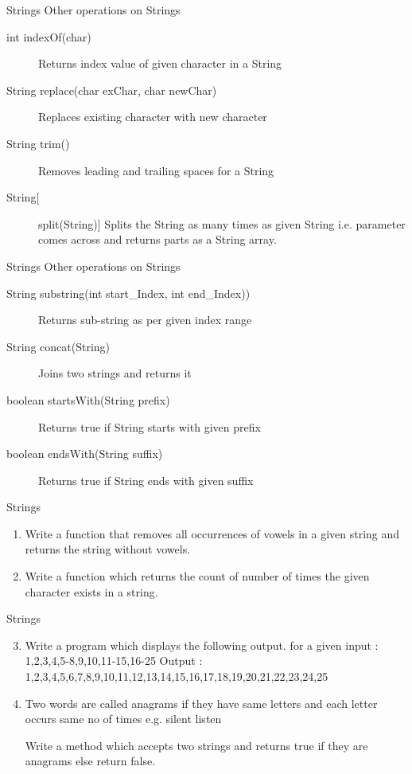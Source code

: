 \documentclass[14pt]{beamer}
\begin{document}
\begin{frame}{Strings}
Other operations on Strings
\begin{description}
\item [int indexOf(char)] Returns index value of given character in a String
\item [String replace(char exChar, char newChar)] Replaces existing character with new character
\item [String trim()] Removes leading and trailing spaces for a String
\item [String[] split(String)] Splits the String as many times as given String i.e. parameter comes across and returns parts as a String array.
\end{description}
\end{frame}

\begin{frame}{Strings}
Other operations on Strings
\begin{description}
\item [String substring(int start\_Index, int end\_Index))] Returns sub-string as per given index range
\item [String concat(String)] Joins two strings and returns it
\item [boolean startsWith(String prefix)] Returns true if String starts with given prefix
\item [boolean endsWith(String suffix)] Returns true if String ends with given suffix
\end{description}
\end{frame}

\begin{frame}{Strings}
\small
\begin{enumerate}
\item Write a function that removes all occurrences of vowels in a given string and returns the string without vowels.

\item Write a function which returns the count of number of times the given character exists in a string.

\end{enumerate}
\end{frame}

\begin{frame}{Strings}
\begin{enumerate}
\setcounter{enumi}{2}
\item Write a program which displays the following output.
for a given input : 1,2,3,4,5-8,9,10,11-15,16-25
Output  : 1,2,3,4,5,6,7,8,9,10,11,12,13,14,15,16,17,18,19,20,21,22,23,24,25

\item Two words are called anagrams if they have same letters and each letter occurs same no of times e.g. silent listen	

Write a method which accepts two strings and returns true if they are anagrams else return false.

\end{enumerate}
\end{frame}
\end{document}
